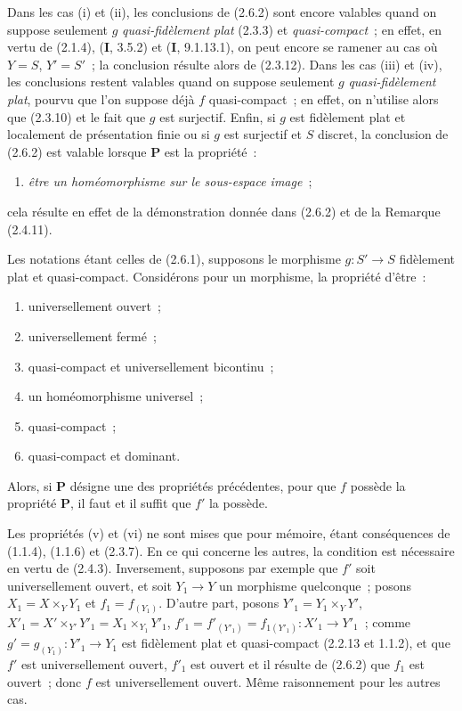 \begin{remark}[2.6.3]
\label{IV.2.6.3-fr}
Dans les cas (i) et (ii), les conclusions de (2.6.2) sont encore valables
quand on suppose seulement $g$ \emph{quasi-fidèlement plat} (2.3.3) et
\emph{quasi-compact}~; en effet, en vertu de (2.1.4), (\textbf{I}, 3.5.2) et
(\textbf{I}, 9.1.13.1), on peut encore se ramener au cas où $Y=S$, $Y'=S'$~; la
conclusion résulte alors de (2.3.12). Dans les cas (iii) et (iv), les
conclusions restent valables quand on suppose seulement $g$ \emph{quasi-fidèlement
plat}, pourvu que l'on suppose déjà $f$ quasi-compact~; en effet, on n'utilise
alors que (2.3.10) et le fait que $g$ est surjectif. Enfin, si $g$ est
fidèlement plat et localement de présentation finie ou si $g$ est surjectif
et $S$ discret, la conclusion de (2.6.2) est valable lorsque $\boldsymbol{P}$ est la
propriété~:
\begin{enumerate}
\item[(iii \emph{bis})] \emph{être un homéomorphisme sur le sous-espace image}~;
\end{enumerate}
cela résulte en effet de la démonstration donnée dans (2.6.2) et de la
Remarque (2.4.11).
\end{remark}

\begin{corollary}[2.6.4]
\label{IV.2.6.4-fr}
Les notations étant celles de \textup{(2.6.1)}, supposons le morphisme $g:S'\to S$
fidèlement plat et quasi-compact. Considérons pour un morphisme, la propriété
d'être~:
\begin{enumerate}
\item[\textup{(i)}] universellement ouvert~;
\item[\textup{(ii)}] universellement fermé~;
\item[\textup{(iii)}] quasi-compact et universellement bicontinu~;
\item[\textup{(iv)}] un homéomorphisme universel~;
\item[\textup{(v)}] quasi-compact~;
\item[\textup{(vi)}] quasi-compact et dominant.
\end{enumerate}
Alors, si $\boldsymbol{P}$ désigne une des propriétés précédentes, pour que $f$ possède la
propriété $\boldsymbol{P}$, il faut et il suffit que $f'$ la possède.
\end{corollary}

Les propriétés (v) et (vi) ne sont mises que pour mémoire, étant conséquences
de (1.1.4), (1.1.6) et (2.3.7). En ce qui concerne les autres, la condition
est nécessaire en vertu de (2.4.3). Inversement, supposons par exemple que
$f'$ soit universellement ouvert, et soit $Y_1\to Y$ un morphisme
quelconque~; posons $X_1=X\times_Y Y_1$ et $f_1=f_{(Y_1)}$. D'autre part,
posons $Y'_1=Y_1\times_Y Y'$, $X'_1=X'\times_{Y'}Y'_1=X_1\times_{Y_1}Y'_1$, $f'_1=f'_{(Y'_1)}=f_{1(Y'_1)}:X'_1\to Y'_1$~;
comme $g'=g_{(Y_1)}:Y'_1\to Y_1$ est fidèlement plat et quasi-compact
(2.2.13 et 1.1.2), et que $f'$ est universellement ouvert, $f'_1$ est ouvert
et il résulte de (2.6.2) que $f_1$ est ouvert~; donc $f$ est universellement
ouvert. Même raisonnement pour les autres cas.

